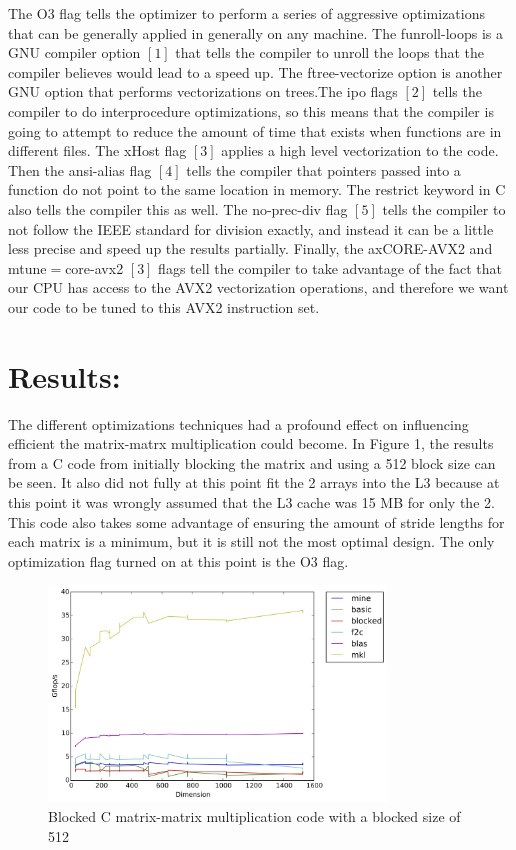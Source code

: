 \documentclass{article}
\begin{document}
The O3 flag tells the optimizer to perform a series of aggressive optimizations that can be generally applied in generally on any machine. The funroll-loops is a GNU compiler option $[1]$ that tells the compiler to unroll the loops that the compiler believes would lead to a speed up. The ftree-vectorize option is another GNU option that performs vectorizations on trees.The ipo flags $[2]$ tells the compiler to do interprocedure optimizations, so this means that the compiler is going to attempt to reduce the amount of time that exists when functions are in different files. The xHost flag $[3]$ applies a high level vectorization to the code. Then the ansi-alias flag $[4]$ tells the compiler that pointers passed into a function do not point to the same location in memory. The restrict keyword in C also tells the compiler this as well. The no-prec-div flag $[5]$ tells the compiler to not follow the IEEE standard for division exactly, and instead it can be a little less precise and speed up the results partially. Finally, the axCORE-AVX2  and mtune$=$core-avx2 $[3]$ flags tell the compiler to take advantage of the fact that our CPU has access to the AVX2 vectorization operations, and therefore we want our code to be tuned to this AVX2 instruction set. 

\section*{Results:}

The different optimizations techniques had a profound effect on influencing efficient the matrix-matrx multiplication could become. In Figure 1, the results from a C code from initially blocking the matrix and using a 512 block size  can be seen. It also did not fully at this point fit the 2 arrays into the L3 because at this point it was wrongly assumed that the L3 cache was 15 MB for only the 2. This code also takes some advantage of ensuring the amount of stride lengths for each matrix is a minimum, but it is still not the most optimal design. The only optimization flag turned on at this point is the O3 flag.

\begin{figure}[H]
  \centering
    \includegraphics[width=0.8\textwidth]{cblocked_no_opt_flags}
    \caption{Blocked C matrix-matrix multiplication code with a blocked size of 512}
\end{figure}
\end{document}
